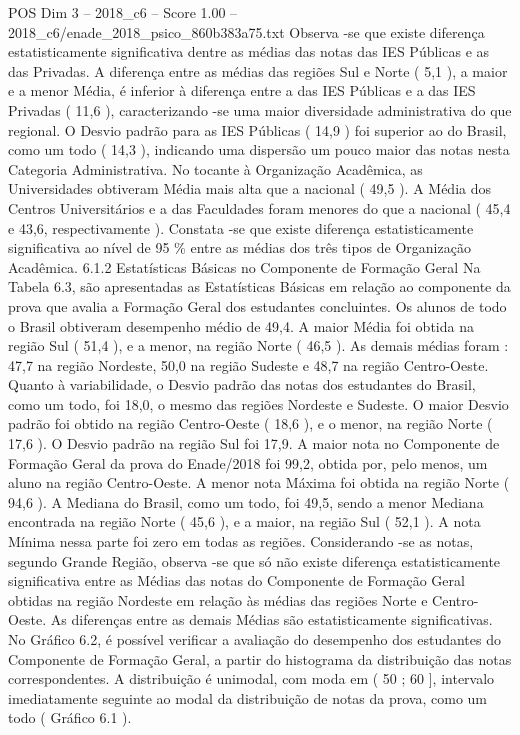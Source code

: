 \begin{textsample}{POS Dim 3 – 2018\_c6 – Score 1.00 – 2018\_c6/enade\_2018\_psico\_860b383a75.txt}
Observa -se que existe diferença estatisticamente significativa dentre as médias das notas das IES Públicas e as das Privadas.
A diferença entre as médias das regiões Sul e Norte ( 5,1 ), a maior e a menor Média, é inferior à diferença entre a das IES Públicas e a das IES Privadas ( 11,6 ), caracterizando -se uma maior diversidade administrativa do que regional.
O Desvio padrão para as IES Públicas ( 14,9 ) foi superior ao do Brasil, como um todo ( 14,3 ), indicando uma dispersão um pouco maior das notas nesta Categoria Administrativa.
No tocante à Organização Acadêmica, as Universidades obtiveram Média mais alta que a nacional ( 49,5 ).
A Média dos Centros Universitários e a das Faculdades foram menores do que a nacional ( 45,4 e 43,6, respectivamente ).
Constata -se que existe diferença estatisticamente significativa ao nível de 95 \% entre as médias dos três tipos de Organização Acadêmica. 6.1.2 Estatísticas Básicas no Componente de Formação Geral Na Tabela 6.3, são apresentadas as Estatísticas Básicas em relação ao componente da prova que avalia a Formação Geral dos estudantes concluintes.
Os alunos de todo o Brasil obtiveram desempenho médio de 49,4.
A maior Média foi obtida na região Sul ( 51,4 ), e a menor, na região Norte ( 46,5 ).
As demais médias foram : 47,7 na região Nordeste, 50,0 na região Sudeste e 48,7 na região Centro-Oeste.
Quanto à variabilidade, o Desvio padrão das notas dos estudantes do Brasil, como um todo, foi 18,0, o mesmo das regiões Nordeste e Sudeste.
O maior Desvio padrão foi obtido na região Centro-Oeste ( 18,6 ), e o menor, na região Norte ( 17,6 ).
O Desvio padrão na região Sul foi 17,9.
A maior nota no Componente de Formação Geral da prova do Enade/2018 foi 99,2, obtida por, pelo menos, um aluno na região Centro-Oeste.
A menor nota Máxima foi obtida na região Norte ( 94,6 ).
A Mediana do Brasil, como um todo, foi 49,5, sendo a menor Mediana encontrada na região Norte ( 45,6 ), e a maior, na região Sul ( 52,1 ).
A nota Mínima nessa parte foi zero em todas as regiões.
Considerando -se as notas, segundo Grande Região, observa -se que só não existe diferença estatisticamente significativa entre as Médias das notas do Componente de Formação Geral obtidas na região Nordeste em relação às médias das regiões Norte e Centro-Oeste.
As diferenças entre as demais Médias são estatisticamente significativas.
No Gráfico 6.2, é possível verificar a avaliação do desempenho dos estudantes do Componente de Formação Geral, a partir do histograma da distribuição das notas correspondentes.
A distribuição é unimodal, com moda em ( 50 ; 60 ], intervalo imediatamente seguinte ao modal da distribuição de notas da prova, como um todo ( Gráfico 6.1 ).

\end{textsample}
